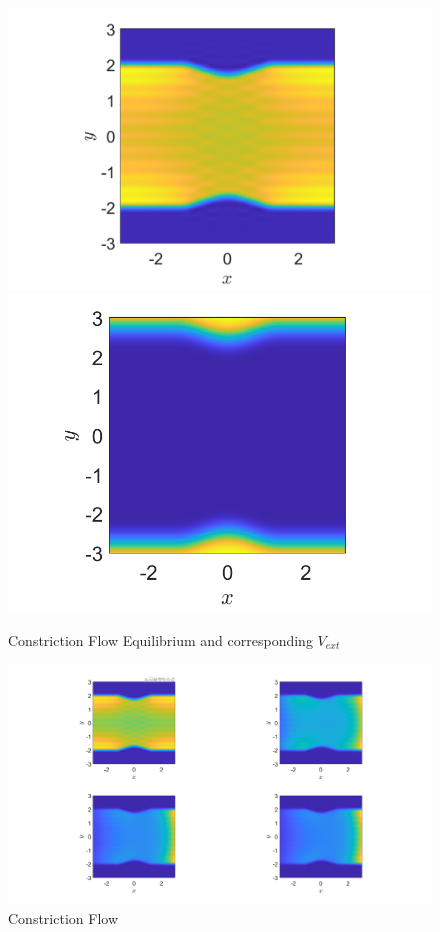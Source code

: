 \documentclass[11pt, a4paper]{article}
\theoremstyle{definition}
\begin{document}
	\begin{figure}[h]
		\centering
		\includegraphics[scale=0.3]{Con1.png}
		\includegraphics[scale=0.33]{Vext.png}
		\caption{Constriction Flow Equilibrium and corresponding $V_{ext}$} 
		\label{F5}
	\end{figure} 
	\begin{figure}[h]
		\centering
		\includegraphics[scale=0.25]{Con2.png}
		\caption{Constriction Flow} 
		\label{F6}
	\end{figure} 
\end{document}
